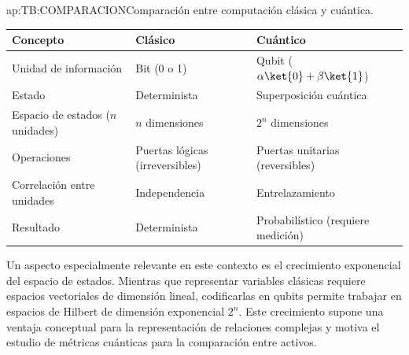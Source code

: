 \begin{table}[Comparación clásica vs cuántica]{ap:TB:COMPARACION}{Comparación entre computación clásica y cuántica.}
	\begin{tabular}{lll}
		\hline
		\textbf{Concepto} & \textbf{Clásico} & \textbf{Cuántico} \\
		\hline \hline
		Unidad de información & Bit (0 o 1) & Qubit ($\alpha\ket{0} + \beta\ket{1}$) \\
		Estado & Determinista & Superposición cuántica \\
		Espacio de estados ($n$ unidades) & $n$ dimensiones & $2^n$ dimensiones \\
		Operaciones & Puertas lógicas (irreversibles) & Puertas unitarias (reversibles) \\
		Correlación entre unidades & Independencia & Entrelazamiento \\
		Resultado & Determinista & Probabilístico (requiere medición) \\
		\hline
	\end{tabular}
\end{table}

Un aspecto especialmente relevante en este contexto es el crecimiento exponencial del espacio de estados. Mientras que representar variables clásicas requiere espacios vectoriales de dimensión lineal, codificarlas en qubits permite trabajar en espacios de Hilbert de dimensión exponencial $2^n$. Este crecimiento supone una ventaja conceptual para la representación de relaciones complejas y motiva el estudio de métricas cuánticas para la comparación entre activos.
